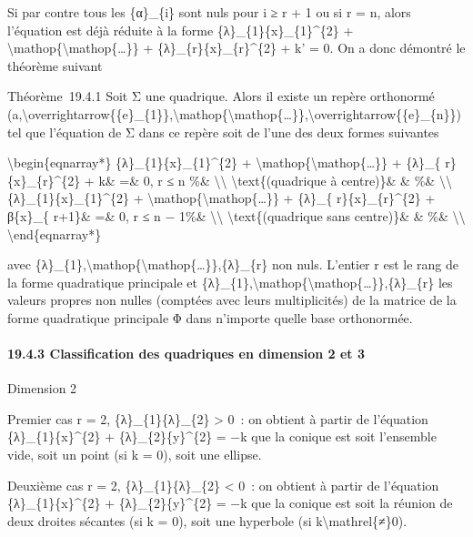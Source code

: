 \documentclass[]{article}
\begin{document}
Si par contre tous les \{α\}\_\{i\} sont nuls pour i ≥ r + 1 ou si r =
n, alors l'équation est déjà réduite à la forme
\{λ\}\_\{1\}\{x\}\_\{1\}\^{}\{2\} +
\textbackslash{}mathop\{\textbackslash{}mathop\{\ldots{}\}\} +
\{λ\}\_\{r\}\{x\}\_\{r\}\^{}\{2\} + k' = 0. On a donc démontré le
théorème suivant

Théorème~19.4.1 Soit Σ une quadrique. Alors il existe un repère
orthonormé
(a,\textbackslash{}overrightarrow\{\{e\}\_\{1\}\},\textbackslash{}mathop\{\textbackslash{}mathop\{\ldots{}\}\},\textbackslash{}overrightarrow\{\{e\}\_\{n\}\})
tel que l'équation de Σ dans ce repère soit de l'une des deux formes
suivantes

\textbackslash{}begin\{eqnarray*\} \{λ\}\_\{1\}\{x\}\_\{1\}\^{}\{2\} +
\textbackslash{}mathop\{\textbackslash{}mathop\{\ldots{}\}\} + \{λ\}\_\{
r\}\{x\}\_\{r\}\^{}\{2\} + k\& =\& 0, r ≤ n \%\&
\textbackslash{}\textbackslash{} \textbackslash{}text\{(quadrique à
centre)\}\& \& \%\& \textbackslash{}\textbackslash{}
\{λ\}\_\{1\}\{x\}\_\{1\}\^{}\{2\} +
\textbackslash{}mathop\{\textbackslash{}mathop\{\ldots{}\}\} + \{λ\}\_\{
r\}\{x\}\_\{r\}\^{}\{2\} + β\{x\}\_\{ r+1\}\& =\& 0, r ≤ n − 1\%\&
\textbackslash{}\textbackslash{} \textbackslash{}text\{(quadrique sans
centre)\}\& \& \%\& \textbackslash{}\textbackslash{}
\textbackslash{}end\{eqnarray*\}

avec
\{λ\}\_\{1\},\textbackslash{}mathop\{\textbackslash{}mathop\{\ldots{}\}\},\{λ\}\_\{r\}
non nuls. L'entier r est le rang de la forme quadratique principale et
\{λ\}\_\{1\},\textbackslash{}mathop\{\textbackslash{}mathop\{\ldots{}\}\},\{λ\}\_\{r\}
les valeurs propres non nulles (comptées avec leurs multiplicités) de la
matrice de la forme quadratique principale Φ dans n'importe quelle base
orthonormée.

\paragraph{19.4.3 Classification des quadriques en dimension 2 et 3}

Dimension 2

Premier cas r = 2, \{λ\}\_\{1\}\{λ\}\_\{2\} \textgreater{} 0~: on
obtient à partir de l'équation \{λ\}\_\{1\}\{x\}\^{}\{2\} +
\{λ\}\_\{2\}\{y\}\^{}\{2\} = −k que la conique est soit l'ensemble vide,
soit un point (si k = 0), soit une ellipse.

Deuxième cas r = 2, \{λ\}\_\{1\}\{λ\}\_\{2\} \textless{} 0~: on obtient
à partir de l'équation \{λ\}\_\{1\}\{x\}\^{}\{2\} +
\{λ\}\_\{2\}\{y\}\^{}\{2\} = −k que la conique est soit la réunion de
deux droites sécantes (si k = 0), soit une hyperbole (si
k\textbackslash{}mathrel\{≠\}0).
\end{document}
